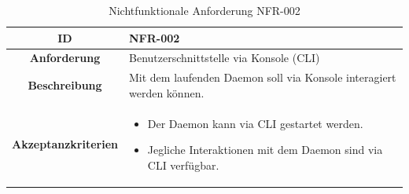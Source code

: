 \documentclass[a4paper,12pt]{report}
\begin{document}
    \begin{table}[h!]
        \centering
        \setlength{\leftmargini}{0.4cm}
        \begin{tabular}{|c|p{10cm}|}
            \hline
            \textbf{ID}           & NFR-002                                                              \\ \hline
            \textbf{Anforderung}  & Benutzerschnittstelle via Konsole (CLI)                              \\ \hline
            \textbf{Beschreibung} & Mit dem laufenden Daemon soll via Konsole interagiert werden können. \\ \hline
            \textbf{Akzeptanzkriterien} &
            \begin{itemize}
                \item Der Daemon kann via CLI gestartet werden.
                \item Jegliche Interaktionen mit dem Daemon sind via CLI verfügbar.
            \end{itemize}
            \\ \hline
        \end{tabular}
        \caption{Nichtfunktionale Anforderung NFR-002}\label{tab:table4}
    \end{table}
\end{document}
